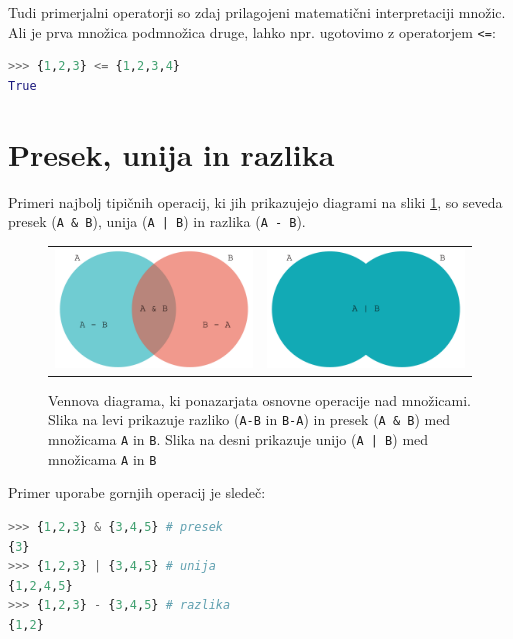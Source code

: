 Tudi primerjalni operatorji so zdaj prilagojeni matematični interpretaciji množic. Ali je prva množica podmnožica druge, lahko npr. ugotovimo z operatorjem \texttt{<=}:
\begin{lstlisting}[language=Python]
>>> {1,2,3} <= {1,2,3,4}
True
\end{lstlisting}

\section{Presek, unija in razlika}

Primeri najbolj tipičnih operacij, ki jih prikazujejo diagrami na sliki \ref{img:mnozice}, so seveda presek (\texttt{A \& B}), unija (\texttt{A | B}) in razlika (\texttt{A - B}).
\begin{figure}
    \centering
    \begin{tabular}{cc}
    \includegraphics[width=0.45\linewidth]{img/mnozice1.pdf} & \includegraphics[width=0.45\linewidth]{img/mnozice2.pdf}\\
    \end{tabular}
    \caption{Vennova diagrama, ki ponazarjata osnovne operacije nad množicami. Slika na levi prikazuje razliko (\texttt{A-B} in \texttt{B-A}) in presek (\texttt{A \& B}) med množicama \texttt{A} in \texttt{B}. Slika na desni prikazuje unijo (\texttt{A | B}) med množicama \texttt{A} in \texttt{B}}
    \label{img:mnozice}
\end{figure}
Primer uporabe gornjih operacij je sledeč:
\begin{lstlisting}[language=Python]
>>> {1,2,3} & {3,4,5} # presek
{3}
>>> {1,2,3} | {3,4,5} # unija
{1,2,4,5}
>>> {1,2,3} - {3,4,5} # razlika
{1,2}
\end{lstlisting}

